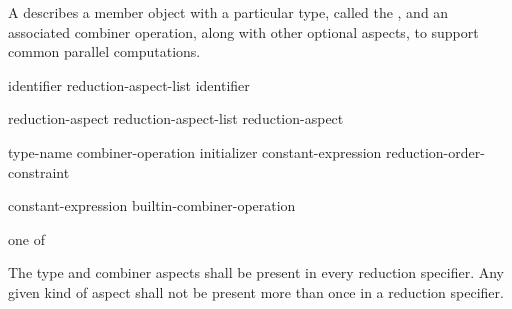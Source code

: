 
\pnum
A
describes a member object with a particular type,
called the
,
and an associated combiner operation,
along with other optional aspects,
to support common parallel computations.


\pnum
\begin{bnf}
\br
{} identifier\opt{} \terminal{\{} reduction-aspect-list \terminal{\}}
\br
{} identifier
\end{bnf}

\begin{bnf}
\br
reduction-aspect
\br
reduction-aspect-list \terminal{,} reduction-aspect
\end{bnf}

\begin{bnf}
\br
{} \terminal{:} type-name
\br
{} \terminal{:} combiner-operation
\br
{} \terminal{:} initializer
\br
{} \terminal{:} constant-expression
\br
{} \terminal{:} reduction-order-constraint
\end{bnf}

\begin{bnf}
\br
constant-expression
\br
builtin-combiner-operation
\end{bnf}

\begin{bnf}
\textnormal{one of}
\br
\terminal{*=} \terminal{+=}
\br
\terminal{\&=} \terminal{\textasciicircum=} \terminal{|=}
\br
{} 
\br
{} 
\br
{}
\end{bnf}

\begin{bnf}
\br
{}
\br
{}
\br
{}
\end{bnf}


\pnum
The type and combiner aspects shall be present in every reduction specifier.
Any given kind of aspect shall not be present more than once
in a reduction specifier. 

